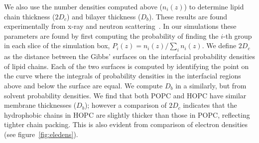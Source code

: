 \documentclass[12pt,openany,final]{book}
\begin{document}
We also use the number densities computed above ($n_i(z)$) to determine lipid chain 
thickness ($2D_c$) and bilayer thickness ($D_b$). These results are found experimentally from 
x-ray and neutron scattering~\cite{fogarty:2015}. In our simulations these parameters 
are found by first computing the probability of
finding the $i$-th group in each slice of the simulation box,
$P_i(z)={n_i(z)}/{\sum_i n_i(z)}$. We define $2D_c$ as the distance between the Gibbs' surfaces on the 
interfacial probability densities of lipid chains. Each of the two surfaces is computed by identifying the
point on the curve where 
the integrals of probability densities in the interfacial regions above and below the surface are equal. 
We compute $D_b$ in a similarly, but from solvent probability densities. 
We find that both POPC and HOPC have similar membrane thicknesses ($D_b$); however a comparison of $2D_c$ 
indicates that the hydrophobic chains in HOPC are slightly thicker than those in POPC, reflecting tighter chain packing. This 
is also evident from comparison of electron densities (see figure~\ref{fig:eledens}). 
\end{document}
